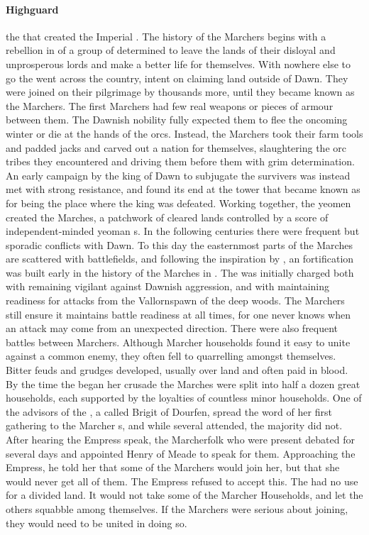 \paragraph{Highguard} the  that created the Imperial .
The history of the Marchers begins with a rebellion in  of a group of  determined to leave the lands of their disloyal and unprosperous lords and make a better life for themselves. With nowhere else to go the  went across the country, intent on claiming land outside of Dawn. They were joined on their pilgrimage by thousands more, until they became known as the Marchers.
\localpar
The first Marchers had few real weapons or pieces of armour between them. The Dawnish nobility fully expected them to flee the oncoming winter or die at the hands of the orcs. Instead, the Marchers took their farm tools and padded jacks and carved out a nation for themselves, slaughtering the orc tribes they encountered and driving them before them with grim determination.
An early campaign by the king of Dawn to subjugate the survivers was instead met with strong resistance, and found its end at the  tower that became known as  for being the place where the king was defeated.
Working together, the yeomen created the Marches, a patchwork of cleared lands controlled by a score of independent-minded yeoman s.
\localpar
In the following centuries there were frequent but sporadic conflicts with Dawn. To this day the easternmost parts of the Marches are scattered with battlefields, and following the inspiration by , an fortification was built early in the history of the Marches in . The  was initially charged both with remaining vigilant against Dawnish aggression, and with maintaining readiness for attacks from the Vallornspawn of the deep woods. The Marchers still ensure it maintains battle readiness at all times, for one never knows when an attack may come from an unexpected direction.
\localpar
There were also frequent battles between Marchers. Although Marcher households found it easy to unite against a common enemy, they often fell to quarrelling amongst themselves. Bitter feuds and grudges developed, usually over land and often paid in blood. By the time the  began her crusade the Marches were split into half a dozen great households, each supported by the loyalties of countless minor households.
\localpar
{}
One of the advisors of the , a  called Brigit of Dourfen, spread the word of her first gathering to the Marcher s, and while several attended, the majority did not. After hearing the Empress speak, the Marcherfolk who were present debated for several days and appointed Henry of Meade to speak for them. Approaching the Empress, he told her that some of the Marchers would join her, but that she would never get all of them. The Empress refused to accept this. The  had no use for a divided land. It would not take some of the Marcher Households, and let the others squabble among themselves. If the Marchers were serious about joining, they would need to be united in doing so.
